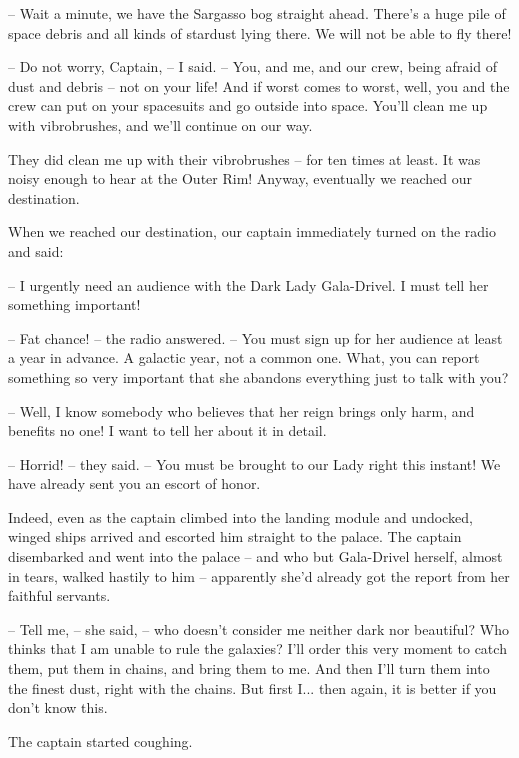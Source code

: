 \documentclass[ebook,oneside,final,openright]{memoir}
\begin{document}
– Wait a minute, we have the Sargasso bog straight ahead. There’s a huge pile of space debris and all kinds of stardust lying there. We will not be able to fly there!\par
– Do not worry, Captain, – I said. – You, and me, and our crew, being afraid of dust and debris – not on your life! And if worst comes to worst, well, you and the crew can put on your spacesuits and go outside into space. You’ll clean me up with vibrobrushes, and we’ll continue on our way.\par
\par
They did clean me up with their vibrobrushes – for ten times at least. It was noisy enough to hear at the Outer Rim! Anyway, eventually we reached our destination.\par
\par
When we reached our destination, our captain immediately turned on the radio and said:\par
– I urgently need an audience with the Dark Lady Gala-Drivel. I must tell her something important! \par
– Fat chance! – the radio answered. – You must sign up for her audience at least a year in advance. A galactic year, not a common one. What, you can report something so very important that she abandons everything just to talk with you?\par
– Well, I know somebody who believes that her reign brings only harm, and benefits no one! I want to tell her about it in detail.\par
– Horrid! – they said. – You must be brought to our Lady right this instant! We have already sent you an escort of honor.\par
\par
Indeed, even as the captain climbed into the landing module and undocked, winged ships arrived and escorted him straight to the palace. The captain disembarked and went into the palace – and who but Gala-Drivel herself, almost in tears, walked hastily to him – apparently she’d already got the report from her faithful servants.\par
– Tell me, – she said, – who doesn’t consider me neither dark nor beautiful? Who thinks that I am unable to rule the galaxies? I’ll order this very moment to catch them, put them in chains, and bring them to me. And then I’ll turn them into the finest dust, right with the chains. But first I... then again, it is better if you don’t know this.\par
The captain started coughing.\par
\end{document}
